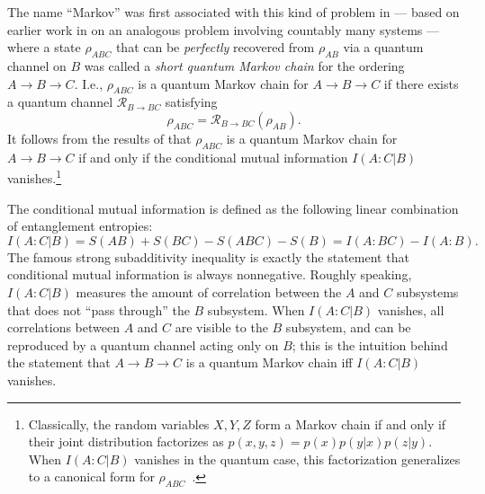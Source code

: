 \documentclass[a4paper,11pt]{article}
\begin{document}
The name ``Markov'' was first associated with this kind of problem in \cite{markov-states} --- based on earlier work in \cite{accardi1983markovian} on an analogous problem involving countably many systems --- where a state $\rho_{ABC}$ that can be \emph{perfectly} recovered from $\rho_{AB}$ via a quantum channel on $B$ was called a \emph{short quantum Markov chain} for the ordering $A \rightarrow B \rightarrow C$. I.e., $\rho_{ABC}$ is a quantum Markov chain for $A \rightarrow B \rightarrow C$ if there exists a quantum channel $\mathcal{R}_{B \rightarrow BC}$ satisfying
\begin{equation}
    \rho_{ABC} = \mathcal{R}_{B \rightarrow BC}(\rho_{AB}).
\end{equation}
It follows from the results of \cite{petz1986sufficient} that $\rho_{ABC}$ is a quantum Markov chain for $A \rightarrow B \rightarrow C$ if and only if the conditional mutual information $I(A:C|B)$ vanishes.\footnote{Classically, the random variables $X, Y, Z$ form a Markov chain if and only if their joint distribution factorizes as $p(x,y,z) = p(x)p(y|x)p(z|y)$. When $I(A:C|B)$ vanishes in the quantum case, this factorization generalizes to a canonical form for $\rho_{ABC}$~\cite{markov-states}.}

The conditional mutual information is defined as the following linear combination of entanglement entropies:
\begin{equation}
    I(A:C|B) = S(AB) + S(BC) - S(ABC) - S(B) = I(A:BC) - I(A:B).
\end{equation}
The famous strong subadditivity inequality is exactly the statement that conditional mutual information is always nonnegative. Roughly speaking, $I(A:C|B)$ measures the amount of correlation between the $A$ and $C$ subsystems that does not ``pass through'' the $B$ subsystem. When $I(A:C|B)$ vanishes, all correlations between $A$ and $C$ are visible to the $B$ subsystem, and can be reproduced by a quantum channel acting only on $B$; this is the intuition behind the statement that $A \rightarrow B \rightarrow C$ is a quantum Markov chain iff $I(A:C|B)$ vanishes.
\end{document}
